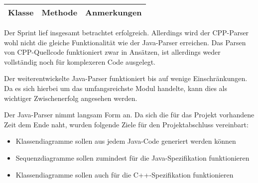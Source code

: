 \begin{table}[H]

\begin{tabularx}{\textwidth}{ |l|l|X| }
\hline
\textbf{Klasse} & \textbf{Methode} & \textbf{Anmerkungen}\\
\hline
\end{tabularx}
\end{table}

\nsecend%

Der Sprint lief insgesamt betrachtet erfolgreich. Allerdings wird der CPP-Parser wohl nicht die gleiche Funktionalität wie der Java-Parser erreichen. Das Parsen von CPP-Quellcode funktioniert zwar in Ansätzen, ist allerdings weder vollständig noch für komplexeren Code ausgelegt.
\nsecend%

Der weiterentwickelte Java-Parser funktioniert bis auf wenige Einschränkungen. Da es sich hierbei um das umfangsreichste Modul handelte, kann dies als wichtiger Zwischenerfolg angesehen werden.
\nsecend%

Der Java-Parser nimmt langsam Form an. Da sich die für das Projekt vorhandene Zeit dem Ende naht, wurden folgende Ziele für den Projektabschluss vereinbart:
\begin{itemize}
\item Klassendiagramme sollen aus jedem Java-Code generiert werden können
\item Sequenzdiagramme sollen zumindest für die Java-Spezifikation funktionieren
\item Klassendiagramme sollen auch für die C++-Spezifikation funktionieren
\end{itemize}
\nsecend%